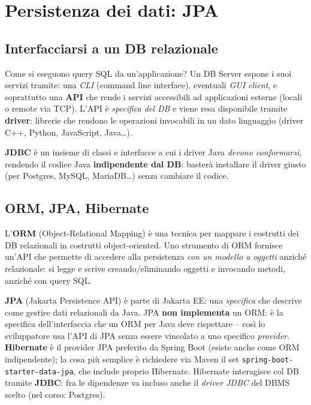 \chapter{Persistenza dei dati: JPA}

\section{Interfacciarsi a un DB relazionale}

Come si eseguono query SQL da un'applicazione? Un DB Server espone i suoi servizi tramite:
una \emph{CLI} (command line interface), eventuali \emph{GUI client}, e soprattutto una
\textbf{API} che rende i servizi accessibili ad applicazioni esterne (locali o remote via
TCP). L'API \`e \emph{specifica del DB} e viene resa disponibile tramite \textbf{driver}:
librerie che rendono le operazioni invocabili in un dato linguaggio (driver C++, Python,
JavaScript, Java\dots).

\begin{definizione}[JDBC]
\textbf{JDBC} \`e un insieme di classi e interfacce a cui i driver Java \emph{devono
conformarsi}, rendendo il codice Java \textbf{indipendente dal DB}: baster\`a installare il
driver giusto (per Postgres, MySQL, MariaDB\dots) senza cambiare il codice.
\end{definizione}

\section{ORM, JPA, Hibernate}

\begin{definizione}[ORM]
L'\textbf{ORM} (Object-Relational Mapping) \`e una tecnica per mappare i costrutti dei DB
relazionali in costrutti object-oriented. Uno strumento di ORM fornisce un'API che permette
di accedere alla persistenza \emph{con un modello a oggetti} anzich\'e relazionale: si legge
e scrive creando/eliminando oggetti e invocando metodi, anzich\'e con query SQL.
\end{definizione}

\begin{definizione}
\textbf{JPA} (Jakarta Persistence API) \`e parte di Jakarta EE: una \emph{specifica} che
descrive come gestire dati relazionali da Java. JPA \textbf{non implementa} un ORM: \`e la
specifica dell'interfaccia che un ORM per Java deve rispettare -- cos\`i lo sviluppatore usa
l'API di JPA senza essere vincolato a uno specifico \emph{provider}. \textbf{Hibernate} \`e
il provider JPA preferito da Spring Boot (esiste anche come ORM indipendente); la cosa pi\`u
semplice \`e richiedere via Maven il set \texttt{spring-boot-starter-data-jpa}, che include
proprio Hibernate. Hibernate interagisce col DB tramite \textbf{JDBC}: fra le dipendenze va
incluso anche il \emph{driver JDBC} del DBMS scelto (nel corso: Postgres).
\end{definizione}

